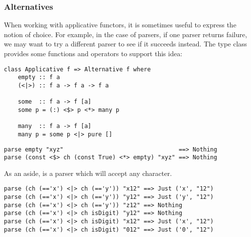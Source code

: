 \taskLine

\subsubsection{Alternatives}

When working with applicative functors, it is sometimes useful to express the notion of choice. For example, in the case of parsers, if one parser returns failure, we may want to try a different parser to see if it succeeds instead. The  type class provides some functions and operators to support this idea:
\begin{verbatim}
class Applicative f => Alternative f where
    empty :: f a
    (<|>) :: f a -> f a -> f a

    some  :: f a -> f [a]
    some p = (:) <$> p <*> many p

    many  :: f a -> f [a]
    many p = some p <|> pure []
\end{verbatim}

\taskLine

\begin{verbatim}
parse empty "xyz"                                 ==> Nothing
parse (const <$> ch (const True) <*> empty) "xyz" ==> Nothing
\end{verbatim}
As an aside,  is a parser which will accept any character.

\begin{verbatim}
parse (ch (=='x') <|> ch (=='y')) "x12" ==> Just ('x', "12")
parse (ch (=='x') <|> ch (=='y')) "y12" ==> Just ('y', "12")
parse (ch (=='x') <|> ch (=='y')) "z12" ==> Nothing
parse (ch (=='x') <|> ch isDigit) "y12" ==> Nothing
parse (ch (=='x') <|> ch isDigit) "x12" ==> Just ('x', "12")
parse (ch (=='x') <|> ch isDigit) "012" ==> Just ('0', "12")
\end{verbatim}

